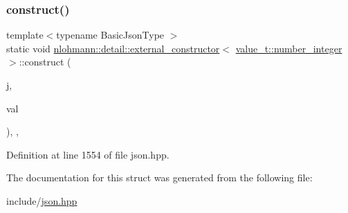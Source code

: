 \subsubsection{\texorpdfstring{construct()}{construct()}}
{\footnotesize\ttfamily template$<$typename Basic\+Json\+Type $>$ \\
static void \hyperlink{structnlohmann_1_1detail_1_1external__constructor}{nlohmann\+::detail\+::external\+\_\+constructor}$<$ \hyperlink{namespacenlohmann_1_1detail_a1ed8fc6239da25abcaf681d30ace4985a5763da164f8659d94a56e29df64b4bcc}{value\+\_\+t\+::number\+\_\+integer} $>$\+::construct (\begin{DoxyParamCaption}\item[{Basic\+Json\+Type \&}]{j,  }\item[{typename Basic\+Json\+Type\+::number\+\_\+integer\+\_\+t}]{val }\end{DoxyParamCaption})\hspace{0.3cm}{\ttfamily [inline]}, {\ttfamily [static]}, {\ttfamily [noexcept]}}



Definition at line 1554 of file json.\+hpp.



The documentation for this struct was generated from the following file\+:\begin{DoxyCompactItemize}
\item 
include/\hyperlink{json_8hpp}{json.\+hpp}\end{DoxyCompactItemize}
